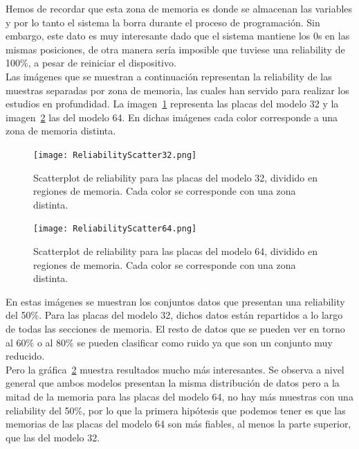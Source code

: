 \documentclass[spanish]{template/minim}
\begin{document}
Hemos de recordar que esta zona de memoria es donde se almacenan las variables y por lo tanto el sistema la borra durante el proceso de programación. Sin embargo, este dato es muy interesante dado que el sistema mantiene los 0s en las mismas posiciones, de otra manera sería imposible que tuviese una reliability de 100\%, a pesar de reiniciar el dispositivo.\\


Las imágenes que se muestran a continuación representan la reliability de las muestras separadas por zona de memoria, las cuales han servido para realizar los estudios en profundidad. La imagen~\ref{fig:rel_scatter_zoom32} representa las placas del modelo 32 y la imagen~\ref{fig:rel_scatter_zoom64} las del modelo 64. En dichas imágenes cada color corresponde a una zona de memoria distinta.\\

\begin{fullwidth}
\begin{figure}[H]
    \centering
    \texttt{[image: ReliabilityScatter32.png]}
    \caption[Scatterplot de reliability]{
            Scatterplot de reliability para las placas del modelo 32, dividido en regiones de memoria. Cada color se corresponde con una zona distinta.\label{fig:rel_scatter_zoom32}
    }
\end{figure}
\end{fullwidth}

\begin{fullwidth}
\begin{figure}[H]
    \centering
    \texttt{[image: ReliabilityScatter64.png]}
    \caption[Scatterplot de reliability]{
            Scatterplot de reliability para las placas del modelo 64, dividido en regiones de memoria. Cada color se corresponde con una zona distinta.\label{fig:rel_scatter_zoom64}
    }
\end{figure}
\end{fullwidth}

En estas imágenes se muestran los conjuntos datos que presentan una reliability del 50\%. Para las placas del modelo 32, dichos datos están repartidos a lo largo de todas las secciones de memoria. El resto de datos que se pueden ver en torno al 60\% o al 80\% se pueden clasificar como ruido ya que son un conjunto muy reducido.\\

Pero la gráfica~\ref{fig:rel_scatter_zoom64} muestra resultados mucho más interesantes. Se observa a nivel general que ambos modelos presentan la misma distribución de datos pero a la mitad de la memoria para las placas del modelo 64, no hay más muestras con una reliability del 50\%, por lo que la primera hipótesis que podemos tener es que las memorias de las placas del modelo 64 son más fiables, al menos la parte superior, que las del modelo 32.\\
\end{document}
